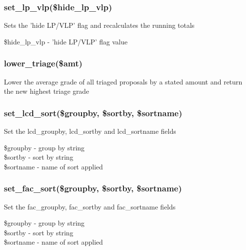 \documentclass{article}
\begin{document}
\subsubsection*{set\_lp\_vlp(\$hide\_lp\_vlp)\label{Panel_set_lp_vlp_hide_lp_vlp_}}


Sets the 'hide LP/VLP' flag and recalculates the running totals

\begin{description}

\item[{\$hide\_lp\_vlp - 'hide LP/VLP' flag value}] \mbox{}\end{description}
\subsubsection*{lower\_triage(\$amt)\label{Panel_lower_triage_amt_}}


Lower the average grade of all triaged proposals by a stated amount and 
return the new highest triage grade

\subsubsection*{set\_lcd\_sort(\$groupby, \$sortby, \$sortname)\label{Panel_set_lcd_sort_groupby_sortby_sortname_}}


Set the lcd\_groupby, lcd\_sortby and lcd\_sortname fields

\begin{description}

\item[{\$groupby - group by string}] \mbox{}
\item[{\$sortby - sort by string}] \mbox{}
\item[{\$sortname - name of sort applied}] \mbox{}\end{description}
\subsubsection*{set\_fac\_sort(\$groupby, \$sortby, \$sortname)\label{Panel_set_fac_sort_groupby_sortby_sortname_}}


Set the fac\_groupby, fac\_sortby and fac\_sortname fields

\begin{description}

\item[{\$groupby - group by string}] \mbox{}
\item[{\$sortby - sort by string}] \mbox{}
\item[{\$sortname - name of sort applied}] \mbox{}\end{description}
\end{document}
